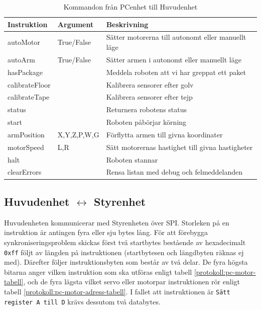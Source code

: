 \begin{table}[h!]
	\centering
	\begin{tabularx}{\textwidth}{| l | l | X |}
		\hline
		\textbf{Instruktion} & \textbf{Argument} & \textbf{Beskrivning} \\\hline
		{autoMotor} & {True/False} & {Sätter motorerna till autonomt eller manuellt läge} \\\hline
		{autoArm} & {True/False} & {Sätter armen i autonomt eller manuellt läge} \\\hline
		{hasPackage} & {} & {Meddela roboten att vi har greppat ett paket} \\\hline
		{calibrateFloor} & {} & {Kalibrera sensorer efter golv} \\\hline
		{calibrateTape} & {} & {Kalibrera sensorer efter tejp} \\\hline
		{status} & {} & {Returnera robotens status} \\\hline
		{start} & {} & {Roboten påbörjar körning} \\\hline
		{armPosition} & {X,Y,Z,P,W,G} & {Förflytta armen till givna koordinater} \\\hline
		{motorSpeed} & {L,R} & {Sätt motorernas hastighet till givna hastigheter} \\\hline
		{halt} & {} & {Roboten stannar} \\\hline
		{clearErrors} & {} & {Rensa listan med debug och felmeddelanden} \\\hline
	\end{tabularx}
	\caption{Kommandon från PCenhet till Huvudenhet} \label{protokoll:pc-huvud-tabell}
\end{table}

\subsection{Huvudenhet $\longleftrightarrow$ Styrenhet}

Huvudenheten kommunicerar med Styrenheten över SPI. Storleken på en instruktion är antingen fyra eller sju bytes lång. För att förebygga synkroniseringsproblem skickas först två startbytes bestående av hexadecimalt \texttt{0xff} följt av längden på instruktionen (startbytesen och längdbyten räknas ej med). Därefter följer instruktionsbyten som består av två delar. De fyra högsta bitarna anger vilken instruktion som ska utföras enligt tabell \ref{protokoll:pc-motor-tabell}, och de fyra lägsta vilket servo eller motorpar instruktionen rör enligt tabell \ref{protokoll:pc-motor-adress-tabell}. I fallet att instruktionen är \texttt{Sätt register A till D} krävs dessutom två databytes.

